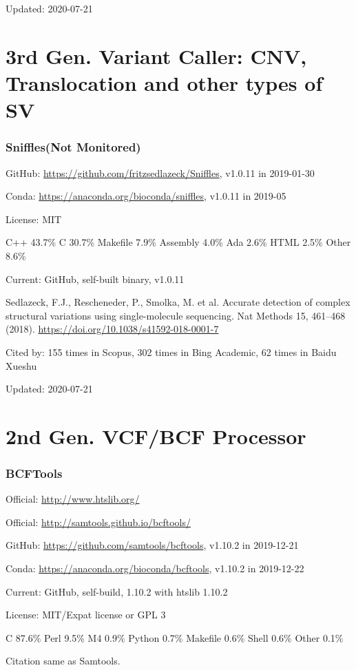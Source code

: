 \documentclass[]{article}
\newcommand{\nm}{{\color{red}(Not Monitored)}}
\newcommand{\cb}[3]{\par Cited by: {\color{blue}\Huge #1} times in Scopus, {\color{blue}\Huge #2} times in Bing Academic, {\color{blue}\Huge #3} times in Baidu Xueshu}
\begin{document}
Updated: 2020-07-21

\part{3rd Gen. Variant Caller: CNV, Translocation and other types of SV}

\section{Sniffles\nm}

GitHub: \url{https://github.com/fritzsedlazeck/Sniffles}, v1.0.11 in 2019-01-30

Conda: \url{https://anaconda.org/bioconda/sniffles}, v1.0.11 in 2019-05

License: MIT

C++ 43.7\% C 30.7\% Makefile 7.9\% Assembly 4.0\% Ada 2.6\% HTML 2.5\% Other 8.6\%

Current: GitHub, self-built binary, v1.0.11

Sedlazeck, F.J., Rescheneder, P., Smolka, M. et al. Accurate detection of complex structural variations using single-molecule sequencing. Nat Methods 15, 461–468 (2018). \url{https://doi.org/10.1038/s41592-018-0001-7}\cb{155}{302}{62}

Updated: 2020-07-21

\part{2nd Gen. VCF/BCF Processor}

\section{BCFTools}

Official: \url{http://www.htslib.org/}

Official: \url{http://samtools.github.io/bcftools/}

GitHub: \url{https://github.com/samtools/bcftools}, v1.10.2 in 2019-12-21

Conda: \url{https://anaconda.org/bioconda/bcftools}, v1.10.2 in 2019-12-22

Current: GitHub, self-build, 1.10.2 with htslib 1.10.2

License: MIT/Expat license or GPL 3

C 87.6\% Perl 9.5\% M4 0.9\% Python 0.7\% Makefile 0.6\% Shell 0.6\% Other 0.1\%

Citation same as Samtools.
\end{document}
